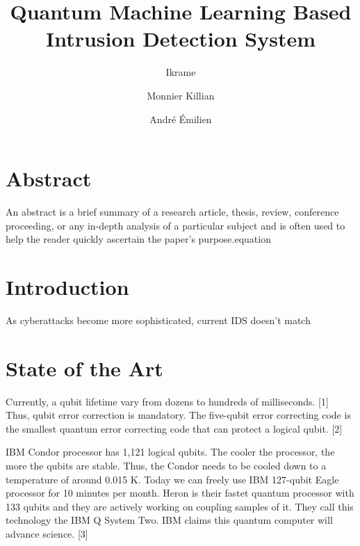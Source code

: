 \documentclass{article}
\author{Ikrame\and{Monnier Killian}\and{André Émilien}}
\title{Quantum Machine Learning Based Intrusion Detection System}
\begin{document}
\maketitle
\section{Abstract}
An abstract is a brief summary of a research article, thesis, review, 
conference proceeding, or any in-depth analysis of a particular subject and is 
often used to help the reader quickly ascertain the paper's purpose.equation
\section{Introduction}
As cyberattacks become more sophisticated, current IDS doesn't match
\section{State of the Art}
Currently, a qubit lifetime vary from dozens to hundreds of milliseconds. [1]
Thus, qubit error correction is mandatory. The five-qubit error correcting 
code is the smallest quantum error correcting code that can protect a logical 
qubit. [2]\par
IBM Condor processor has 1,121 logical qubits. The cooler the processor, 
the more the qubits are stable. Thus, the Condor needs to be cooled down to a 
temperature of around 0.015 K. Today we can freely use IBM 127-qubit Eagle processor 
for 10 minutes per month. Heron is their fastet quantum processor with 133 
qubits and they are actively working on coupling samples of it. They call this 
technology the IBM Q System Two. IBM claims this quantum computer will advance 
science. [3]
\end{document}
